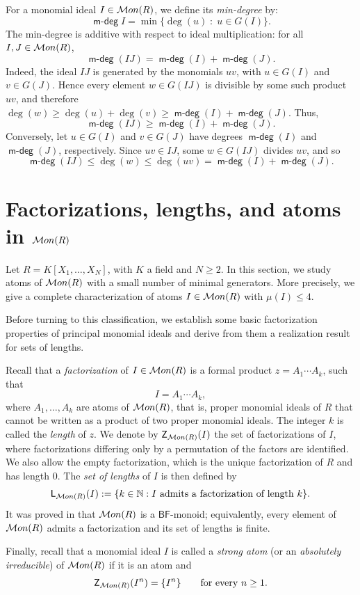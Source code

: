\documentclass[10pt,a4paper]{amsart}
\providecommand\Mon{{\mathcal{M}{\rm on}}}
\DeclareMathOperator{\mdeg}{\mathsf {m-deg}}
\begin{document}
For a monomial ideal $I\in \Mon(R)$, we define its {\it min-degree} by:
\[\mdeg{I}=\min\{\deg(u) \; \colon \; u\in G(I)\}.\]
The min-degree is additive with respect to ideal multiplication: for all $I,J\in\Mon(R)$,
\[\mdeg(IJ)=\mdeg(I)+\mdeg(J).\]
Indeed, the ideal $IJ$ is generated by the monomials $uv$, with $u\in G(I)$ and $v\in G(J)$. Hence every element $w\in G(IJ)$ is divisible by some such product $uv$, and therefore $\deg(w)\geq \deg(u)+\deg(v)\geq \mdeg(I)+\mdeg(J)$. Thus,\[\mdeg(IJ)\geq \mdeg(I)+\mdeg(J).\]
Conversely, let $u\in G(I)$ and $v\in G(J)$ have degrees $\mdeg(I)$ and $\mdeg(J)$, respectively. Since $uv\in IJ$, some $w\in G(IJ)$ divides $uv$, and so
\[\mdeg(IJ)\leq \deg(w)\leq \deg(uv)=\mdeg(I)+\mdeg(J).\]

\section{Factorizations, lengths, and atoms in $\Mon(R)$}

Let $R=K[X_1,\ldots, X_N]$, with $K$ a field and $N\ge 2$. In this section, we study atoms of $\Mon(R)$ with a small number of minimal generators. More precisely, we give a complete characterization of atoms $I\in\Mon(R)$ with $\mu(I)\le 4$.

Before turning to this classification, we establish some basic factorization properties of principal monomial ideals and derive from them a realization result for sets of lengths. 

Recall that a \textit{factorization} of $I\in\Mon(R)$ is a formal product $z=A_1\cdots A_k$, such that \[I=A_1\cdots A_k,\]
where $A_1,\ldots,A_k$ are atoms of $\Mon(R)$, that is, proper monomial ideals of $R$ that cannot be written as a product of two proper monomial ideals. The integer $k$ is called the \textit{length} of $z$.
We denote by $\mathsf Z_{\Mon(R)}(I)$ the set of factorizations of $I$, where factorizations differing only by a permutation of the factors are identified. We also allow the empty factorization, which is the unique factorization of $R$ and has length $0$. The \textit{set of lengths} of $I$ is then defined by
\[
\mathsf L_{\Mon(R)}(I):=\{k\in\mathbb N : I \text{ admits a factorization of length } k\}.
\] 
It was proved in \cite[Theorem 4.7]{BCK} that $\Mon(R)$ is a $\mathsf{BF}$-monoid; equivalently, every element of $\Mon(R)$ admits a factorization and its set of lengths is finite.

Finally, recall that a monomial ideal $I$ is called a \textit{strong atom} (or an \textit{absolutely irreducible}) of $\Mon(R)$ if it is an atom and
\[\mathsf Z_{\Mon(R)}(I^n)=\{I^n\} \qquad\text{for every }n\ge 1.\]
\end{document}
